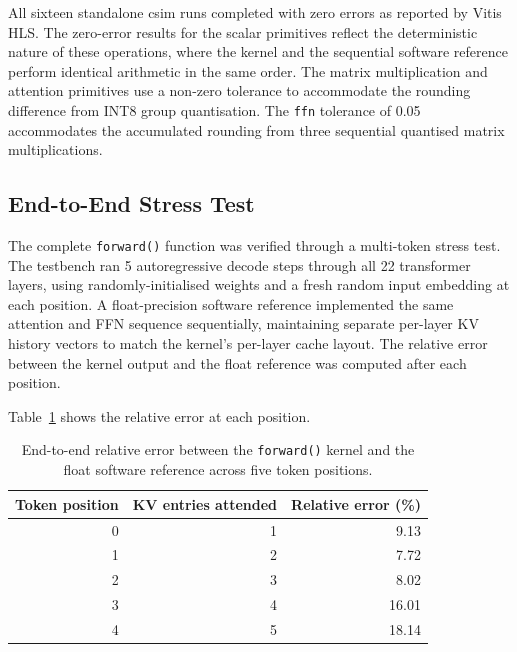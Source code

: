 All sixteen standalone csim runs completed with zero errors as reported by
Vitis HLS. The zero-error results for the scalar primitives reflect the
deterministic nature of these operations, where the kernel and the sequential
software reference perform identical arithmetic in the same order. The matrix
multiplication and attention primitives use a non-zero tolerance to accommodate
the rounding difference from INT8 group quantisation. The \texttt{ffn}
tolerance of 0.05 accommodates the accumulated rounding from three sequential
quantised matrix multiplications.

\subsection{End-to-End Stress Test}
\label{subsec:stress_csim}

The complete \texttt{forward()} function was verified through a multi-token
stress test. The testbench
ran 5 autoregressive decode steps through all 22 transformer layers, using
randomly-initialised weights and a fresh random input embedding at each
position. A float-precision software reference implemented the same attention
and FFN sequence sequentially, maintaining separate per-layer KV history
vectors to match the kernel's per-layer cache layout. The relative error
between the kernel output and the float reference was computed after each
position.

Table~\ref{tab:stress_results} shows the relative error at each position.

\begin{table}[H]
  \centering
  \begin{tabular}{rrr}
    \toprule
    Token position & KV entries attended & Relative error (\%) \\
    \midrule
    0 & 1 &  9.13 \\
    1 & 2 &  7.72 \\
    2 & 3 &  8.02 \\
    3 & 4 & 16.01 \\
    4 & 5 & 18.14 \\
    \bottomrule
  \end{tabular}
  \caption{End-to-end relative error between the \texttt{forward()} kernel
           and the float software reference across five token positions.}
  \label{tab:stress_results}
\end{table}

